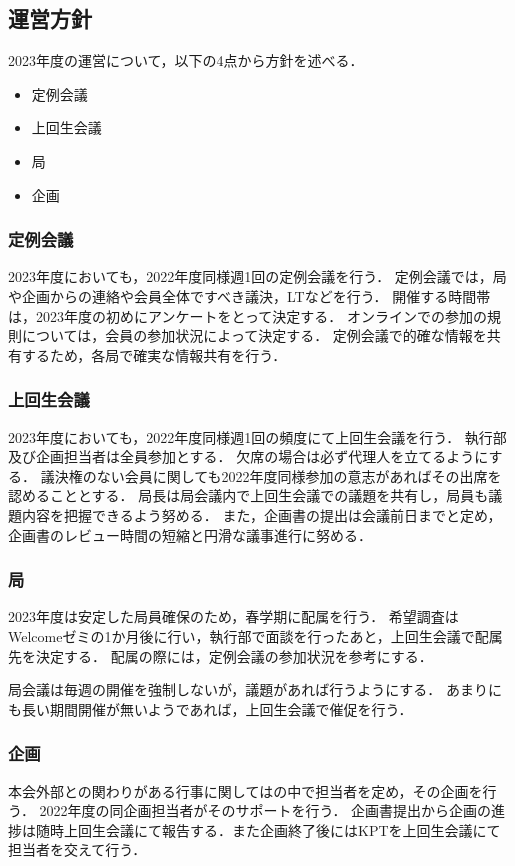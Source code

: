 \subsection*{運営方針}


2023年度の運営について，以下の4点から方針を述べる．
\begin{itemize}
    \item 定例会議
    \item 上回生会議
    \item 局
    \item 企画
\end{itemize}

\subsubsection*{定例会議}
2023年度においても，2022年度同様週1回の定例会議を行う．
定例会議では，局や企画からの連絡や会員全体ですべき議決，LTなどを行う．
開催する時間帯は，2023年度の初めにアンケートをとって決定する．
オンラインでの参加の規則については，会員の参加状況によって決定する．
定例会議で的確な情報を共有するため，各局で確実な情報共有を行う．

\subsubsection*{上回生会議}
2023年度においても，2022年度同様週1回の頻度にて上回生会議を行う．
執行部及び企画担当者は全員参加とする．
欠席の場合は必ず代理人を立てるようにする．
議決権のない会員に関しても2022年度同様参加の意志があればその出席を認めることとする．
局長は局会議内で上回生会議での議題を共有し，局員も議題内容を把握できるよう努める．
また，企画書の提出は会議前日までと定め，企画書のレビュー時間の短縮と円滑な議事進行に努める．

\subsubsection*{局}
2023年度は安定した局員確保のため，春学期に配属を行う．
希望調査はWelcomeゼミの1か月後に行い，執行部で面談を行ったあと，上回生会議で配属先を決定する．
配属の際には，定例会議の参加状況を参考にする．

局会議は毎週の開催を強制しないが，議題があれば行うようにする．
あまりにも長い期間開催が無いようであれば，上回生会議で催促を行う．

\subsubsection*{企画}
本会外部との関わりがある行事に関しては\newGradeIfKouki{}\secondGrade{}の中で担当者を定め，その企画を行う．
2022年度の同企画担当者がそのサポートを行う．
企画書提出から企画の進捗は随時上回生会議にて報告する．また企画終了後にはKPTを上回生会議にて担当者を交えて行う．

